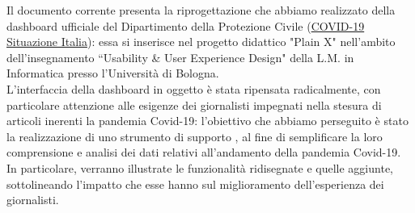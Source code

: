 \documentclass[../../main.tex]{subfiles}
\begin{document}
\begin{executive}

    Il documento corrente presenta la riprogettazione che abbiamo realizzato della dashboard ufficiale del Dipartimento della Protezione Civile (\href{https://opendatadpc.maps.arcgis.com/apps/opsdashboard/index.html#/b0c68bce2cce478eaac82fe38d4138b1}{COVID-19 Situazione Italia}): essa si inserisce nel progetto didattico "Plain X" nell'ambito dell'insegnamento ``Usability \& User Experience Design" della L.M. in Informatica presso l'Università di Bologna.\\
    L'interfaccia della dashboard in oggetto è stata ripensata radicalmente, con particolare attenzione alle esigenze dei giornalisti impegnati nella stesura di articoli inerenti la pandemia Covid-19: l'obiettivo che abbiamo perseguito è stato la realizzazione di uno strumento di supporto , al fine di semplificare la loro comprensione e analisi dei dati relativi all'andamento della pandemia Covid-19.
    In particolare, verranno illustrate le funzionalità ridisegnate e quelle aggiunte, sottolineando l'impatto che esse hanno sul miglioramento dell'esperienza dei giornalisti.

\end{executive}
\end{document}
